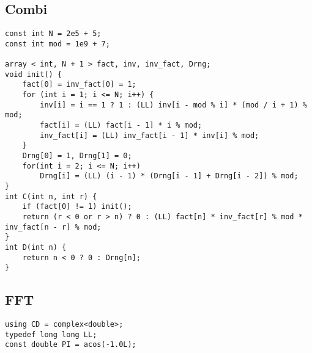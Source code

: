 \documentclass[FSZ,a4paper,onesided]{article}
\begin{document}
\begin{multicols*}{\COLS}
\begin{lstlisting}
\end{lstlisting}
\subsection{Combi}
\begin{lstlisting}
const int N = 2e5 + 5;
const int mod = 1e9 + 7;

array < int, N + 1 > fact, inv, inv_fact, Drng;
void init() {
    fact[0] = inv_fact[0] = 1;
    for (int i = 1; i <= N; i++) {
        inv[i] = i == 1 ? 1 : (LL) inv[i - mod % i] * (mod / i + 1) % mod;
        fact[i] = (LL) fact[i - 1] * i % mod;
        inv_fact[i] = (LL) inv_fact[i - 1] * inv[i] % mod;
    }
    Drng[0] = 1, Drng[1] = 0;
    for(int i = 2; i <= N; i++)
        Drng[i] = (LL) (i - 1) * (Drng[i - 1] + Drng[i - 2]) % mod;
}
int C(int n, int r) {
    if (fact[0] != 1) init();
    return (r < 0 or r > n) ? 0 : (LL) fact[n] * inv_fact[r] % mod * inv_fact[n - r] % mod;
}
int D(int n) { 
    return n < 0 ? 0 : Drng[n];
}\end{lstlisting}
\subsection{FFT}
\begin{lstlisting}
using CD = complex<double>;
typedef long long LL;
const double PI = acos(-1.0L);


\end{lstlisting}
\end{multicols*}
\end{document}
